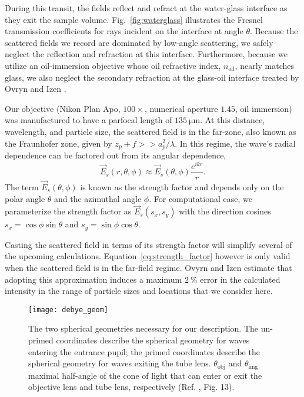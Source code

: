 During this transit, the fields reflect and refract at the water-glass interface as they
exit the sample volume. Fig.~\ref{fig:waterglass} illustrates the Fresnel transmission
coefficients for rays incident on the interface at angle $\theta$.
Because the scattered fields we record are dominated by low-angle scattering,
we safely neglect the reflection and refraction at this interface. Furthermore,
because we utilize an
oil-immersion objective whose oil refractive index, $n_{\text{oil}}$,
nearly matches glass, we also neglect the secondary refraction at the
glass-oil interface treated by Ovryn and Izen \cite{izen00}.

Our objective  (Nikon Plan Apo, $\num{100}\times$, numerical aperture $\num{1.45}$,
oil immersion) was manufactured to have a parfocal length of $\SI{135}{\um}$.
At this distance, wavelength, and particle size, the scattered field is in the far-zone,
also known as the Fraunhofer zone, given by $z_p + f >> a_p^2/\lambda$. In this
regime, the wave's radial dependence can be factored out from its angular dependence,
\begin{equation}
  \label{eq:strength_factor}
  \vec{E}_s(r, \theta, \phi) \approx  \vec{E}_s(\theta, \phi) \frac{e^{ikr}}{r}.
\end{equation}
The term $\vec{E}_s(\theta, \phi)$ is known as the strength factor and
depends only on the polar angle $\theta$ and the azimuthal angle $\phi$.
For computational ease, we parameterize the strength factor as $\vec{E}_s(s_x, s_y)$
with the direction cosines $s_x=\cos{\phi}\sin{\theta}$ and $s_y = \sin{\phi}\cos{\theta}$.

Casting the scattered field in terms of its strength factor will simplify
several of the upcoming calculations. Equation~\eqref{eq:strength_factor} however
is only valid when the scattered field is in the far-field regime.
Ovyrn and Izen\cite{izen00} estimate that adopting this approximation induces a maximum
$\SI{2}{\percent}$ error in the calculated intensity in the range of particle
sizes and locations that we consider here. %

\begin{figure}
  \centering
  \texttt{[image: debye\_geom]}
  \caption{The two spherical geometries necessary for our description. The un-primed coordinates
    describe the spherical geometry for waves entering the entrance pupil; the primed coordinates
    describe the spherical geometry for waves exiting the tube lens. $\theta_{\text{obj}}$ and
    $\theta_{\text{img}}$ maximal half-angle of the cone of light that can enter or exit
    the objective lens and tube lens, respectively (Ref. \cite{capoglu12}, Fig. 13).}
  \label{fig:debye_geom}
\end{figure}

